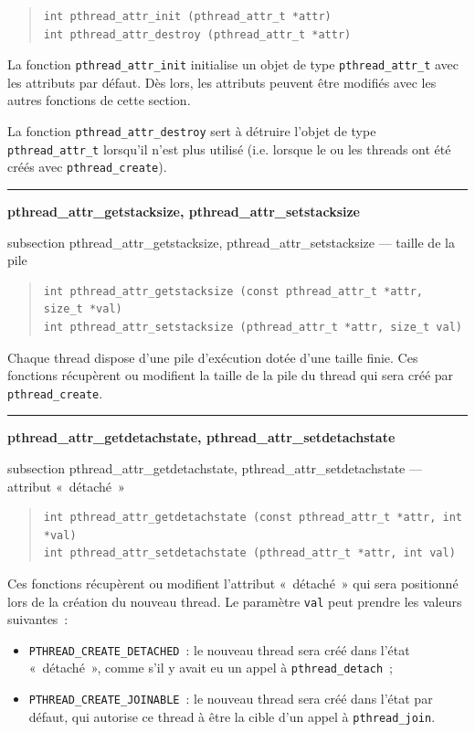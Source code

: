 \documentclass [twoside] {report}
\newcommand {\primitive} [1]
    {
	\phantomsection
	{\large \textbf {#1}}
	\addcontentsline {toc} {subsection} {#1}
    }
\newcommand {\separation}
    {
	\vspace {5mm}
	\nopagebreak
	\hrule
    }
\begin{document}
\begin {quote}
\begin {verbatim}
int pthread_attr_init (pthread_attr_t *attr)
int pthread_attr_destroy (pthread_attr_t *attr)
\end{verbatim}
\end {quote}

La fonction \verb|pthread_attr_init| initialise un objet de type
\verb|pthread_attr_t| avec les attributs par défaut. Dès lors, les
attributs peuvent être modifiés avec les autres fonctions de cette
section.

La fonction \verb|pthread_attr_destroy| sert à détruire l'objet de type
\verb|pthread_attr_t| lorsqu'il n'est plus utilisé (i.e.  lorsque le
ou les threads ont été créés avec \verb|pthread_create|).


\separation
\primitive {pthread\_attr\_getstacksize, pthread\_attr\_setstacksize} --- taille de la pile

\begin {quote}
\begin {verbatim}
int pthread_attr_getstacksize (const pthread_attr_t *attr, size_t *val)
int pthread_attr_setstacksize (pthread_attr_t *attr, size_t val)
\end{verbatim}
\end {quote}

Chaque thread dispose d'une pile d'exécution dotée d'une taille
finie. Ces fonctions récupèrent ou modifient la taille de la pile
du thread qui sera créé par \verb|pthread_create|.


\separation
\primitive {pthread\_attr\_getdetachstate,
pthread\_attr\_setdetachstate} --- attribut «~détaché~»

\begin {quote}
\begin {verbatim}
int pthread_attr_getdetachstate (const pthread_attr_t *attr, int *val)
int pthread_attr_setdetachstate (pthread_attr_t *attr, int val)
\end{verbatim}
\end {quote}

Ces fonctions récupèrent ou modifient l'attribut «~détaché~» qui
sera positionné lors de la création du nouveau thread. Le paramètre
\texttt {val} peut prendre les valeurs suivantes~:

\begin {itemize}
    \item \verb|PTHREAD_CREATE_DETACHED|~: le nouveau thread sera
	créé dans l'état «~détaché~», comme s'il y avait eu un appel
	à \verb|pthread_detach|~;
    \item \verb|PTHREAD_CREATE_JOINABLE|~: le nouveau thread sera
	créé dans l'état par défaut, qui autorise ce thread à être
	la cible d'un appel à \verb|pthread_join|.
\end {itemize}
\end{document}
